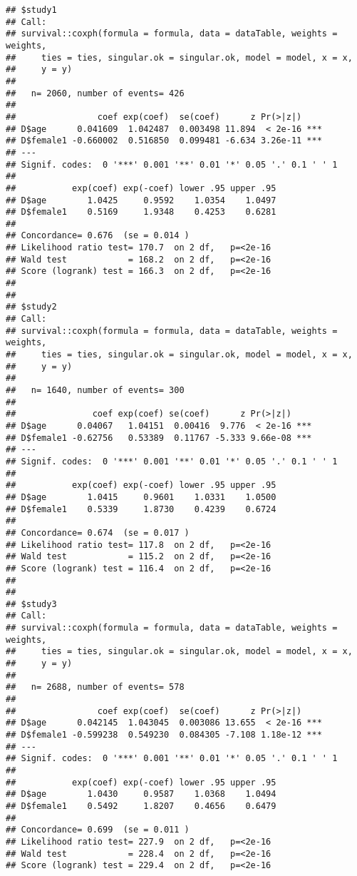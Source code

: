 \documentclass[
]{article}
\begin{document}
\begin{verbatim}
## $study1
## Call:
## survival::coxph(formula = formula, data = dataTable, weights = weights, 
##     ties = ties, singular.ok = singular.ok, model = model, x = x, 
##     y = y)
## 
##   n= 2060, number of events= 426 
## 
##                coef exp(coef)  se(coef)      z Pr(>|z|)    
## D$age      0.041609  1.042487  0.003498 11.894  < 2e-16 ***
## D$female1 -0.660002  0.516850  0.099481 -6.634 3.26e-11 ***
## ---
## Signif. codes:  0 '***' 0.001 '**' 0.01 '*' 0.05 '.' 0.1 ' ' 1
## 
##           exp(coef) exp(-coef) lower .95 upper .95
## D$age        1.0425     0.9592    1.0354    1.0497
## D$female1    0.5169     1.9348    0.4253    0.6281
## 
## Concordance= 0.676  (se = 0.014 )
## Likelihood ratio test= 170.7  on 2 df,   p=<2e-16
## Wald test            = 168.2  on 2 df,   p=<2e-16
## Score (logrank) test = 166.3  on 2 df,   p=<2e-16
## 
## 
## $study2
## Call:
## survival::coxph(formula = formula, data = dataTable, weights = weights, 
##     ties = ties, singular.ok = singular.ok, model = model, x = x, 
##     y = y)
## 
##   n= 1640, number of events= 300 
## 
##               coef exp(coef) se(coef)      z Pr(>|z|)    
## D$age      0.04067   1.04151  0.00416  9.776  < 2e-16 ***
## D$female1 -0.62756   0.53389  0.11767 -5.333 9.66e-08 ***
## ---
## Signif. codes:  0 '***' 0.001 '**' 0.01 '*' 0.05 '.' 0.1 ' ' 1
## 
##           exp(coef) exp(-coef) lower .95 upper .95
## D$age        1.0415     0.9601    1.0331    1.0500
## D$female1    0.5339     1.8730    0.4239    0.6724
## 
## Concordance= 0.674  (se = 0.017 )
## Likelihood ratio test= 117.8  on 2 df,   p=<2e-16
## Wald test            = 115.2  on 2 df,   p=<2e-16
## Score (logrank) test = 116.4  on 2 df,   p=<2e-16
## 
## 
## $study3
## Call:
## survival::coxph(formula = formula, data = dataTable, weights = weights, 
##     ties = ties, singular.ok = singular.ok, model = model, x = x, 
##     y = y)
## 
##   n= 2688, number of events= 578 
## 
##                coef exp(coef)  se(coef)      z Pr(>|z|)    
## D$age      0.042145  1.043045  0.003086 13.655  < 2e-16 ***
## D$female1 -0.599238  0.549230  0.084305 -7.108 1.18e-12 ***
## ---
## Signif. codes:  0 '***' 0.001 '**' 0.01 '*' 0.05 '.' 0.1 ' ' 1
## 
##           exp(coef) exp(-coef) lower .95 upper .95
## D$age        1.0430     0.9587    1.0368    1.0494
## D$female1    0.5492     1.8207    0.4656    0.6479
## 
## Concordance= 0.699  (se = 0.011 )
## Likelihood ratio test= 227.9  on 2 df,   p=<2e-16
## Wald test            = 228.4  on 2 df,   p=<2e-16
## Score (logrank) test = 229.4  on 2 df,   p=<2e-16
\end{verbatim}
\end{document}
